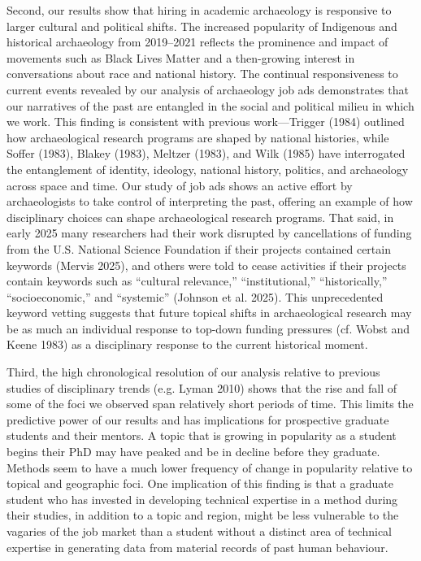 \documentclass[
  12pt,
]{article}
\begin{document}
Second, our results show that hiring in academic archaeology is
responsive to larger cultural and political shifts. The increased
popularity of Indigenous and historical archaeology from 2019--2021
reflects the prominence and impact of movements such as Black Lives
Matter and a then-growing interest in conversations about race and
national history. The continual responsiveness to current events
revealed by our analysis of archaeology job ads demonstrates that our
narratives of the past are entangled in the social and political milieu
in which we work. This finding is consistent with previous
work---Trigger (1984) outlined how archaeological research programs are
shaped by national histories, while Soffer (1983), Blakey (1983),
Meltzer (1983), and Wilk (1985) have interrogated the entanglement of
identity, ideology, national history, politics, and archaeology across
space and time. Our study of job ads shows an active effort by
archaeologists to take control of interpreting the past, offering an
example of how disciplinary choices can shape archaeological research
programs. That said, in early 2025 many researchers had their work
disrupted by cancellations of funding from the U.S. National Science
Foundation if their projects contained certain keywords (Mervis 2025),
and others were told to cease activities if their projects contain
keywords such as ``cultural relevance,'' ``institutional,''
``historically,'' ``socioeconomic,'' and ``systemic'' (Johnson et al.
2025). This unprecedented keyword vetting suggests that future topical
shifts in archaeological research may be as much an individual response
to top-down funding pressures (cf. Wobst and Keene 1983) as a
disciplinary response to the current historical moment.

Third, the high chronological resolution of our analysis relative to
previous studies of disciplinary trends (e.g. Lyman 2010) shows that the
rise and fall of some of the foci we observed span relatively short
periods of time. This limits the predictive power of our results and has
implications for prospective graduate students and their mentors. A
topic that is growing in popularity as a student begins their PhD may
have peaked and be in decline before they graduate. Methods seem to have
a much lower frequency of change in popularity relative to topical and
geographic foci. One implication of this finding is that a graduate
student who has invested in developing technical expertise in a method
during their studies, in addition to a topic and region, might be less
vulnerable to the vagaries of the job market than a student without a
distinct area of technical expertise in generating data from material
records of past human behaviour.
\end{document}
